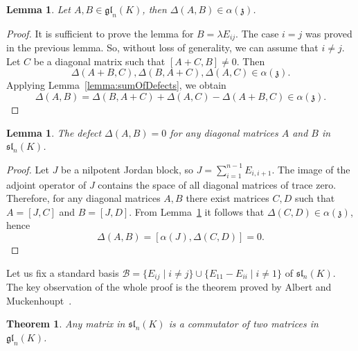 \documentclass[a4paper,reqno,12pt]{amsart}
\newtheorem{lemma}[proposition]{Lemma}
\newtheorem{theorem}[proposition]{Theorem}
\theoremstyle{definition}
\theoremstyle{remark}
\def\zzz{\mathfrak{z}}
\def\gl{\mathfrak{gl}}
\def\sl{\mathfrak{sl}}
\begin{document}
	\begin{lemma}\label{lemma:almostAdditive}
		Let $A, B \in \gl_n(K)$, then $\Delta(A, B) \in \alpha(\zzz)$.
	\end{lemma}

	\begin{proof}
		It is sufficient to prove the lemma for $B = \lambda E_{ij}$. The case $i = j$ was proved in the previous lemma. So, without loss of generality, we can assume that $i \neq j$. Let $C$ be a diagonal matrix such that $[A + C, B] \neq 0$. Then
		\begin{equation*}
			\Delta(A + B, C), \Delta(B, A + C), \Delta(A, C) \in \alpha(\zzz).
		\end{equation*}
		Applying Lemma~\ref{lemma:sumOfDefects}, we obtain
		\begin{equation*}
			\Delta(A, B) = \Delta(B, A + C) + \Delta(A, C) - \Delta(A + B, C) \in \alpha(\zzz).
		\end{equation*}
	\end{proof}

	\begin{lemma}\label{lemma:additivityForDiag}
		The defect $\Delta(A, B) = 0$ for any diagonal matrices $A$ and $B$ in $\sl_n(K)$.
	\end{lemma}

	\begin{proof}
		Let $J$ be a nilpotent Jordan block, so $J = \sum_{i = 1}^{n - 1} E_{i, i + 1}$. The image of the adjoint operator of $J$ contains the space of all diagonal matrices of trace zero. Therefore, for any diagonal matrices $A, B$ there exist matrices $C, D$ such that $A = [J, C]$ and $B = [J, D]$. From Lemma~\ref{lemma:almostAdditive} it follows that $\Delta(C, D) \in \alpha(\zzz)$, hence
		\begin{equation*}
			\Delta(A, B) = [\alpha(J), \Delta(C, D)] = 0.
		\end{equation*}
	\end{proof}

	Let us fix a standard basis $\mathcal{B} = \lbrace E_{ij} \mid i \neq j \rbrace \cup \lbrace E_{11} - E_{ii} \mid i \neq 1 \rbrace$ of $\sl_n(K)$. The key observation of the whole proof is the theorem proved by Albert and Muckenhoupt~\cite{albert_muckenhoupt1957}.

	\begin{theorem}\label{theorem:commutatorWidthForgl}
		Any matrix in $\sl_n(K)$ is a commutator of two matrices in $\gl_n(K)$.
	\end{theorem}
\end{document}
